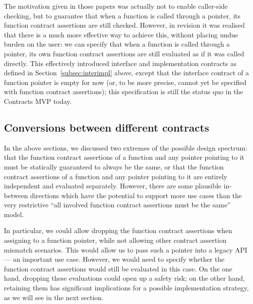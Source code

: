 The motivation given in those papers was actually not to enable caller-side checking, but to guarantee that when a function is called through a pointer, its function contract assertions are still checked. However, in  revision \cite{P0380R1} it was realised that there is a much more effective way to achieve this, without placing undue burden on the user: we can specify that when a function is called through a pointer, its own function contract assertions are still evaluated as if it was called directly. This effectively introduced interface and implementation contracts as defined in Section~\ref{subsec:interimpl} above, except that the interface contract of a function pointer is empty for now (or, to be more precise, cannot yet be specified with function contract assertions); this specification is still the status quo in the Contracts MVP \cite{P2900R7} today.

\subsection{Conversions between different contracts}
\label{subsec:conv}

In the above sections, we discussed two extremes of the possible design spectrum: that the function contract assertions of a function and any pointer pointing to it must be statically guaranteed to always be the same, or that the function contract assertions of a function and any pointer pointing to it are entirely independent and evaluated separately. However, there are some plausible in-between directions which have the potential to support more use cases than the very restrictive ``all involved function contract assertions must be the same'' model.

In particular, we could allow dropping the function contract assertions when assigning to a function pointer, while not allowing other contract assertion mismatch scenarios. This would allow us to pass such a pointer into a legacy API --- an important use case. However, we would need to specify whether the function contract assertions would still be evaluated in this case. On the one hand, dropping these evaluations could open up a safety risk; on the other hand, retaining them has significant implications for a possible implementation strategy, as we will see in the next section.

